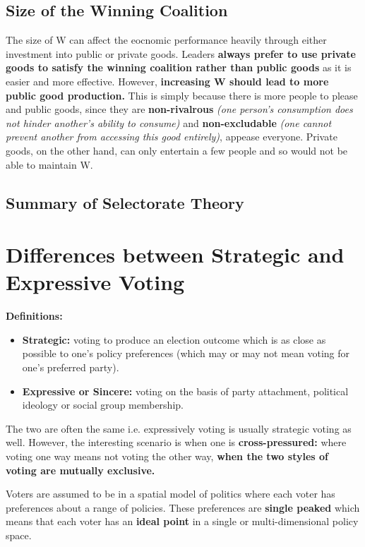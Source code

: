 \documentclass[12pt, letterpaper]{article}
\begin{document}
\subsection{Size of the Winning Coalition}
The size of W can affect the eocnomic performance heavily through either investment into public or private goods. Leaders \textbf{always prefer to use private goods to satisfy the winning coalition rather than public goods} as it is easier and more effective. However, \textbf{increasing W should lead to more public good production.} This is simply because there is more people to please and public goods, since they are \textbf{non-rivalrous} \textit{(one person's consumption does not hinder another's ability to consume)} and \textbf{non-excludable} \textit{(one cannot prevent another from accessing this good entirely)}, appease everyone. Private goods, on the other hand, can only entertain a few people and so would not be able to maintain W.

\subsection{Summary of Selectorate Theory}


\newpage
\section{Differences between Strategic and Expressive Voting}
\textbf{Definitions:}
\begin{itemize}
	\item \textbf{Strategic:} voting to produce an election outcome which is as close as possible to one's policy preferences (which may or may not mean voting for one's preferred party).
	\item \textbf{Expressive or Sincere:} voting on the basis of party attachment, political ideology or social group membership.
\end{itemize}

The two are often the same i.e. expressively voting is usually strategic voting as well. However, the interesting scenario is when one is \textbf{cross-pressured:} where voting one way means not voting the other way, \textbf{when the two styles of voting are mutually exclusive.}

Voters are assumed to be in a spatial model of politics where each voter has preferences about a range of policies. These preferences are \textbf{single peaked} which means that each voter has an \textbf{ideal point} in a single or multi-dimensional policy space.
\end{document}
